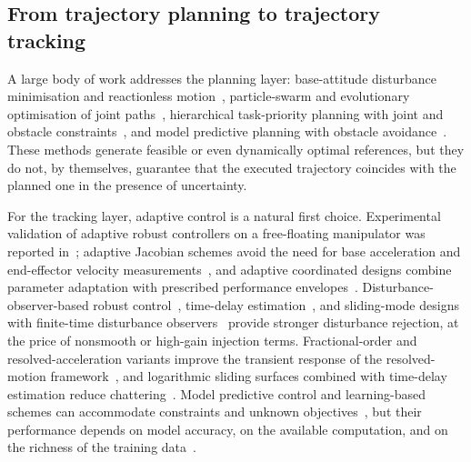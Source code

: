 \subsection{From trajectory planning to trajectory tracking}
A large body of work addresses the planning layer: base-attitude disturbance minimisation and reactionless motion~\cite{yoshida2001zeroreaction,zong2020reactionless,xu2016,zhan2022detumbling}, particle-swarm and evolutionary optimisation of joint paths~\cite{wang2015}, hierarchical task-priority planning with joint and obstacle constraints~\cite{cai2022hierarchical}, and model predictive planning with obstacle avoidance~\cite{wang2016nmpc,yang2025distributionally}. These methods generate feasible or even dynamically optimal references, but they do not, by themselves, guarantee that the executed trajectory coincides with the planned one in the presence of uncertainty.

For the tracking layer, adaptive control is a natural first choice. Experimental validation of adaptive robust controllers on a free-floating manipulator was reported in~\cite{pazelli2011experimental}; adaptive Jacobian schemes avoid the need for base acceleration and end-effector velocity measurements~\cite{wang2012adaptivejacobian}, and adaptive coordinated designs combine parameter adaptation with prescribed performance envelopes~\cite{lu2019adaptivecoordinated}. Disturbance-observer-based robust control~\cite{chu2008dob}, time-delay estimation~\cite{yu2022}, and sliding-mode designs with finite-time disturbance observers~\cite{shao2021ntsm,dou2023fractional,dou2025fractional} provide stronger disturbance rejection, at the price of nonsmooth or high-gain injection terms. Fractional-order and resolved-acceleration variants improve the transient response of the resolved-motion framework~\cite{shao2021fractional}, and logarithmic sliding surfaces combined with time-delay estimation reduce chattering~\cite{wang2025tdelog}. Model predictive control and learning-based schemes can accommodate constraints and unknown objectives~\cite{ning2019,wang2016nmpc,lei2022drl}, but their performance depends on model accuracy, on the available computation, and on the richness of the training data~\cite{yan}.


